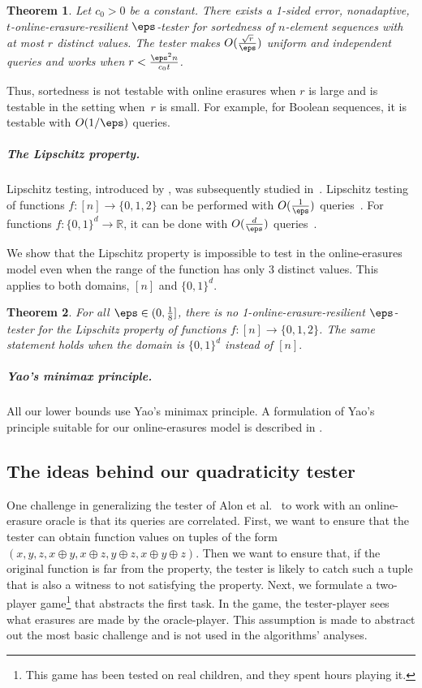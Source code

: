 \documentclass[11pt]{article}
\numberwithin{equation}{section}
\newtheorem{theorem}{Theorem}[section]
\theoremstyle{definition}
\theoremstyle{plain}
\begin{document}
\begin{theorem}\label{thm:sortedness_uniform}
Let $c_0 > 0$ be a constant.
There exists a 1-sided error, nonadaptive, $t$-online-erasure-resilient $\eps$-tester for sortedness of $n$-element sequences with at most $r$ distinct values. The tester makes $O(\frac{\sqrt{r}}{\eps})$ uniform and independent queries and works when $r<\frac{\eps^2 n}{c_0 t}$.
\end{theorem}

Thus, sortedness is not testable with online erasures when $r$ is large and is testable in the setting when~$r$ is small. For example, for Boolean sequences, it is testable with $O(1/\eps)$ queries.



\subparagraph*{The Lipschitz property.} Lipschitz testing, introduced by \cite{JhaR13}, was subsequently studied in~\cite{CS13, DixitJRT13, BermanRY14, AwasthiJMR16, ChakrabartyDJS17}. Lipschitz testing of functions %
$f:[n]\to\{0,1,2\}$ can be performed with $O(\frac 1\eps)$ queries~\cite{JhaR13}. For functions $f:\{0,1\}^d\to\mathbb{R}$, it can be done with $O(\frac d\eps)$ queries~\cite{JhaR13,CS13}. 

We show that the Lipschitz property is impossible to test in the online-erasures model even when the range of the function has only 3 distinct values. This applies to both domains, $[n]$ and $\{0,1\}^d.$
 

\begin{theorem}\label{thm:lipschitz}
    For all $\eps \in (0, \frac{1}{8}]$,
    there is no 1-online-erasure-resilient $\eps$-tester for
    the Lipschitz property of functions $f \colon [n] \to \{0,1,2\}$. 
    The same statement holds when the domain is $\{0,1\}^d$ instead of $[n].$
\end{theorem}


\subparagraph*{Yao's minimax principle.} All our lower bounds use Yao's minimax principle. A formulation of Yao's principle suitable for our online-erasures model 
is described in . 


%
\subsection{The ideas behind our quadraticity tester}\label{sec:techniques}
 One challenge in generalizing
the tester
of Alon et al.~\cite{AlonKKLR05} to work with an online-erasure oracle is that 
%
its queries are correlated. First, we want to ensure that the tester can obtain function values on tuples of the %
form
%
$(x,y,z,x\oplus y, x\oplus z, y\oplus z, x\oplus y \oplus z)$. %
Then  we  want to ensure that, if the original function is far from the property, the tester is likely to catch such a tuple that is also a witness to not satisfying the property. Next, we formulate a two-player game\footnote{This game has been tested on real children, and they spent hours playing it.} that abstracts the first task. 
In the game, the tester-player sees what erasures are made by the oracle-player. This assumption is made to abstract out the most basic challenge and is not used in the algorithms' analyses.
\end{document}
